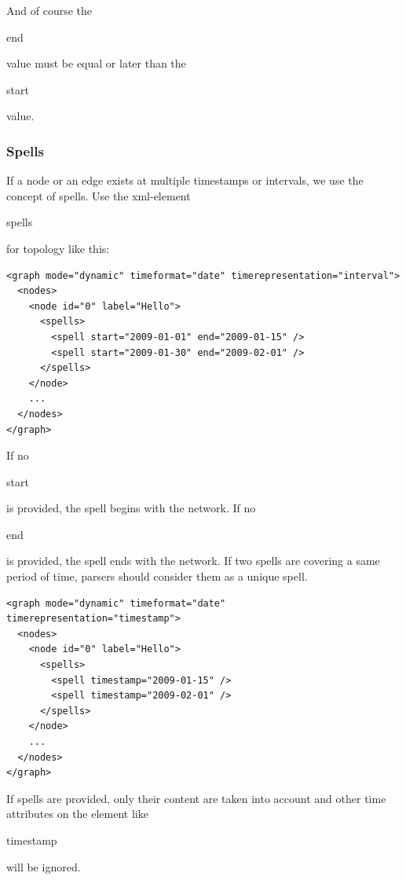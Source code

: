 \documentclass[a4paper,10pt]{article}
\begin{document}
And of course the \begin{footnotesize}end\end{footnotesize} value must be equal or later than the \begin{footnotesize}start\end{footnotesize} value.

\subsubsection{Spells}

If a node or an edge exists at multiple timestamps or intervals, we use the concept of spells. Use the xml-element \begin{footnotesize}spells\end{footnotesize} for topology like this:

\lstset{ style=gexf }
\begin{lstlisting}[caption={Node with multiple spells (Intervals)}]
<graph mode="dynamic" timeformat="date" timerepresentation="interval">
  <nodes>
    <node id="0" label="Hello">
      <spells>
        <spell start="2009-01-01" end="2009-01-15" />
        <spell start="2009-01-30" end="2009-02-01" />
      </spells>
    </node>
    ...
  </nodes>
</graph>
\end{lstlisting}

If no \begin{footnotesize}start\end{footnotesize} is provided, the spell begins with the network. If no \begin{footnotesize}end\end{footnotesize} is provided, the spell ends with the network. If two spells are covering a same period of time, parsers should consider them as a unique spell.

\lstset{ style=gexf }
\begin{lstlisting}[caption={Node with multiple spells (Timestamps)}]
<graph mode="dynamic" timeformat="date" timerepresentation="timestamp">
  <nodes>
    <node id="0" label="Hello">
      <spells>
        <spell timestamp="2009-01-15" />
        <spell timestamp="2009-02-01" />
      </spells>
    </node>
    ...
  </nodes>
</graph>
\end{lstlisting}

If spells are provided, only their content are taken into account and other time attributes on the element like \begin{footnotesize}timestamp\end{footnotesize} will be ignored.
\end{document}
